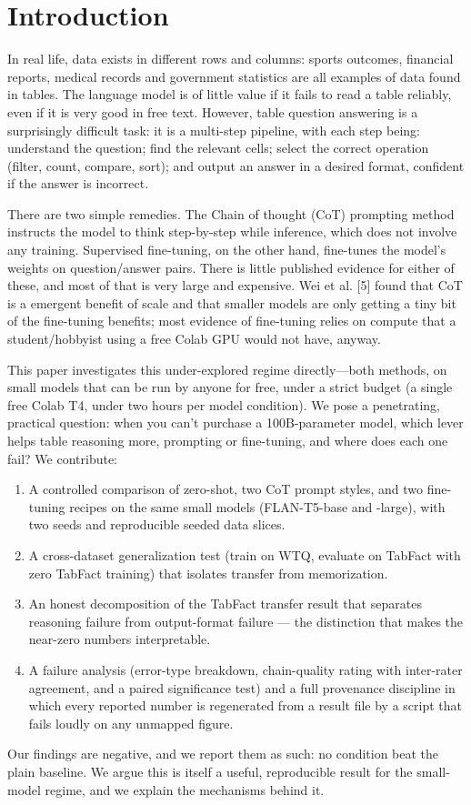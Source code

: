 \documentclass[sigconf]{acmart}
\begin{document}
\section{Introduction}
In real life, data exists in different rows and columns: sports outcomes, financial reports, medical records and government statistics are all examples of data found in tables. The language model is of little value if it fails to read a table reliably, even if it is very good in free text. However, table question answering is a surprisingly difficult task: it is a multi-step pipeline, with each step being: understand the question; find the relevant cells; select the correct operation (filter, count, compare, sort); and output an answer in a desired format, confident if the answer is incorrect.

There are two simple remedies. The Chain of thought (CoT) prompting method instructs the model to think step-by-step while inference, which does not involve any training. Supervised fine-tuning, on the other hand, fine-tunes the model's weights on question/answer pairs. There is little published evidence for either of these, and most of that is very large and expensive. Wei et al. [5] found that CoT is a emergent benefit of scale and that smaller models are only getting a tiny bit of the fine-tuning benefits; most evidence of fine-tuning relies on compute that a student/hobbyist using a free Colab GPU would not have, anyway.

This paper investigates this under-explored regime directly---both methods, on small models that can be run by anyone for free, under a strict budget (a single free Colab T4, under two hours per model condition). We pose a penetrating, practical question: when you can't purchase a 100B-parameter model, which lever helps table reasoning more, prompting or fine-tuning, and where does each one fail? We contribute:
\begin{enumerate}
  \item A controlled comparison of zero-shot, two CoT prompt styles, and two fine-tuning recipes on the same small models (FLAN-T5-base and -large), with two seeds and reproducible seeded data slices.
  \item A cross-dataset generalization test (train on WTQ, evaluate on TabFact with zero TabFact training) that isolates transfer from memorization.
  \item An honest decomposition of the TabFact transfer result that separates reasoning failure from output-format failure --- the distinction that makes the near-zero numbers interpretable.
  \item A failure analysis (error-type breakdown, chain-quality rating with inter-rater agreement, and a paired significance test) and a full provenance discipline in which every reported number is regenerated from a result file by a script that fails loudly on any unmapped figure.
\end{enumerate}
Our findings are negative, and we report them as such: no condition beat the plain baseline. We argue this is itself a useful, reproducible result for the small-model regime, and we explain the mechanisms behind it.
\end{document}
